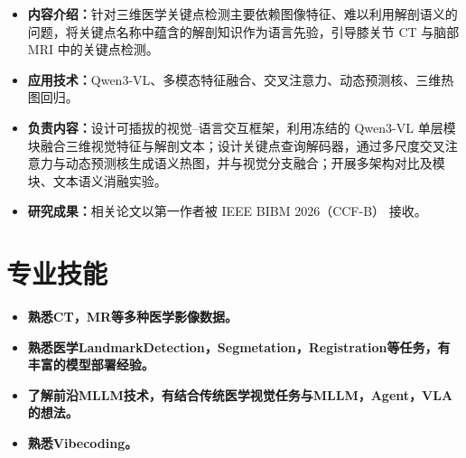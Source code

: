 \documentclass{resume}
\begin{document}
\begin{itemize}
\item \textbf{内容介绍：}针对三维医学关键点检测主要依赖图像特征、难以利用解剖语义的问题，将关键点名称中蕴含的解剖知识作为语言先验，引导膝关节 CT 与脑部 MRI 中的关键点检测。
\item \textbf{应用技术：}Qwen3-VL、多模态特征融合、交叉注意力、动态预测核、三维热图回归。
\item \textbf{负责内容：}设计可插拔的视觉--语言交互框架，利用冻结的 Qwen3-VL 单层模块融合三维视觉特征与解剖文本；设计关键点查询解码器，通过多尺度交叉注意力与动态预测核生成语义热图，并与视觉分支融合；开展多架构对比及模块、文本语义消融实验。
\item \textbf{研究成果：}相关论文以第一作者被 IEEE BIBM 2026（CCF-B） 接收。
\end{itemize}


\section{专业技能}
\begin{itemize}
\item \textbf{熟悉CT，MR等多种医学影像数据。}
\item \textbf{熟悉医学LandmarkDetection，Segmetation，Registration等任务，有丰富的模型部署经验。}
\item \textbf{了解前沿MLLM技术，有结合传统医学视觉任务与MLLM，Agent，VLA的想法。}
\item \textbf{熟悉Vibecoding。}
\end{itemize}
\end{document}
